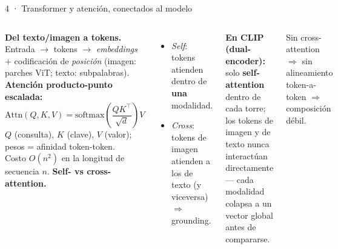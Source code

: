 \documentclass[aspectratio=169]{beamer}
\begin{document}
\begin{frame}{4 · Transformer y atención, conectados al modelo}
  \begin{columns}[T]
    \footnotesize
    \textbf{Del texto/imagen a tokens.} Entrada $\to$ tokens $\to$ \emph{embeddings} + codificación de \emph{posición}
    (imagen: parches ViT; texto: subpalabras).\\[4pt]
    \textbf{Atención producto-punto escalada:}
    \[
      \mathrm{Attn}(Q,K,V)=\mathrm{softmax}\!\left(\frac{QK^{\top}}{\sqrt{d}}\right)V
    \]
    $Q$ (consulta), $K$ (clave), $V$ (valor); pesos = afinidad token-token.\\[4pt]
    Costo \textbf{$O(n^2)$} en la longitud de secuencia $n$.
    \footnotesize
    \textbf{Self- vs cross-attention.}
    \begin{itemize}
      \item \emph{Self}: tokens atienden dentro de \textbf{una} modalidad.
      \item \emph{Cross}: tokens de imagen atienden a los de texto (y viceversa) $\Rightarrow$ grounding.
    \end{itemize}
    \textbf{En CLIP (dual-encoder):} solo \textbf{self-attention} dentro de cada torre; los tokens de imagen
    y de texto \alert{nunca} interactúan directamente --- cada modalidad colapsa a un vector global antes de compararse.
    \par\vspace{3pt}
    \alert{Sin cross-attention $\Rightarrow$ sin alineamiento token-a-token $\Rightarrow$ composición débil.}
  \end{columns}
\end{frame}
\end{document}
